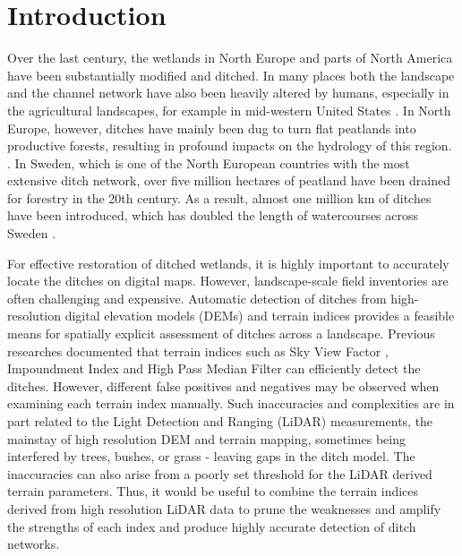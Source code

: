 \documentclass[11pt, review]{elsarticle} %
\begin{document}
\newpage
\section{Introduction}\label{introduction}

Over the last century, the wetlands in North Europe and parts of North America have been substantially modified and ditched. In many places both the landscape and the channel network have also been heavily altered  by humans, especially in the agricultural landscapes, for example in mid-western United States \citep{passalacqua}. In North Europe, however, ditches have mainly been dug to turn flat peatlands into productive forests, resulting in profound impacts on the hydrology of this region. \citep{peatlands}. In Sweden, which is one of the North European countries with the most extensive ditch network, over five million hectares of peatland have been drained for forestry in the 20th century.  As a result, almost one million km of ditches have been introduced, which has doubled the length of watercourses across Sweden  \citep{hasselquist}.

For effective restoration of ditched wetlands, it is highly important  to accurately locate the ditches on digital maps. However, landscape-scale field inventories are often challenging and expensive. Automatic detection of ditches from high-resolution digital elevation models (DEMs) and terrain indices provides a feasible means for spatially explicit assessment of ditches across a landscape. Previous researches  \citep{uppsala} documented  that terrain indices such as Sky View Factor \citep{zaksek}, Impoundment Index \citep{whiteboxtools} and High Pass Median Filter \citep{whiteboxtools} can efficiently  detect the ditches. However, different false positives and negatives may be observed when examining each terrain index manually. Such inaccuracies and complexities are in part related to the Light Detection and Ranging (LiDAR) measurements, the mainstay of high resolution DEM and terrain mapping, sometimes being interfered by trees, bushes, or grass - leaving gaps in the ditch model. The inaccuracies can also arise from a poorly set threshold for the LiDAR derived terrain parameters. Thus, it would be useful to combine the terrain indices derived from high resolution LiDAR data to prune the weaknesses and amplify the strengths of each index and produce highly accurate detection of ditch networks.
\end{document}
